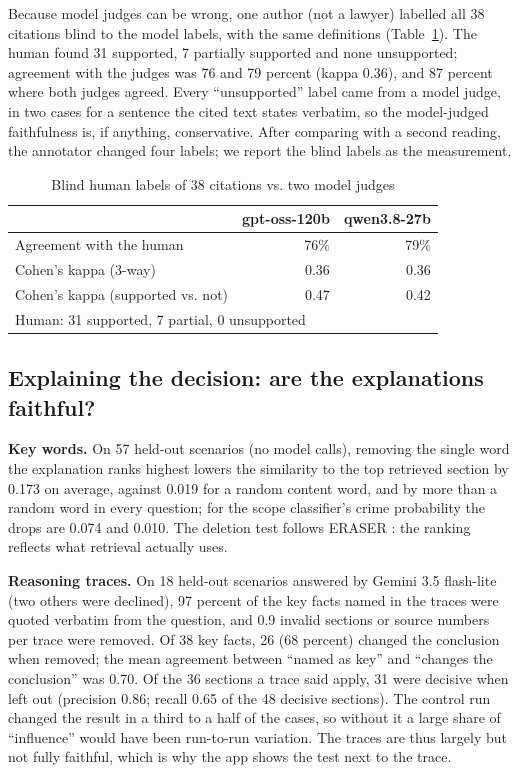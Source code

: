 \documentclass[conference]{IEEEtran}
\begin{document}
Because model judges can be wrong, one author (not a lawyer) labelled all 38 citations blind to the
model labels, with the same definitions (Table~\ref{tab:spot}). The human found 31 supported, 7
partially supported and none unsupported; agreement with the judges was 76 and 79 percent (kappa
0.36), and 87 percent where both judges agreed. Every ``unsupported'' label came from a model judge,
in two cases for a sentence the cited text states verbatim, so the model-judged faithfulness is, if
anything, conservative. After comparing with a second reading, the annotator changed four labels;
we report the blind labels as the measurement.

\begin{table}[t]
\caption{Blind human labels of 38 citations vs. two model judges}
\label{tab:spot}
\centering
\footnotesize
\begin{tabular}{lrr}
\toprule
 & gpt-oss-120b & qwen3.8-27b \\
\midrule
Agreement with the human & 76\% & 79\% \\
Cohen's kappa (3-way) & 0.36 & 0.36 \\
Cohen's kappa (supported vs. not) & 0.47 & 0.42 \\
\midrule
\multicolumn{3}{l}{Human: 31 supported, 7 partial, 0 unsupported} \\
\bottomrule
\end{tabular}
\end{table}

\subsection{Explaining the decision: are the explanations faithful?}\label{sec:xai-results}

\textbf{Key words.} On 57 held-out scenarios (no model calls), removing the single word the explanation
ranks highest lowers the similarity to the top retrieved section by 0.173 on average, against 0.019 for
a random content word, and by more than a random word in every question; for the scope classifier's
crime probability the drops are 0.074 and 0.010. The deletion test follows ERASER
\cite{deyoung2020eraser}: the ranking reflects what retrieval actually uses.

\textbf{Reasoning traces.} On 18 held-out scenarios answered by Gemini 3.5 flash-lite (two others were
declined), 97 percent of the key facts named in the traces were quoted verbatim from the question, and
0.9 invalid sections or source numbers per trace were removed. Of 38 key facts, 26 (68 percent) changed
the conclusion when removed; the mean agreement between ``named as key'' and ``changes the conclusion''
was 0.70. Of the 36 sections a trace said apply, 31 were decisive when left out (precision 0.86;
recall 0.65 of the 48 decisive sections). The control run changed the result in a third to a half of
the cases, so without it a large share of ``influence'' would have been run-to-run variation. The
traces are thus largely but not fully faithful, which is why the app shows the test next to the trace.
\end{document}
